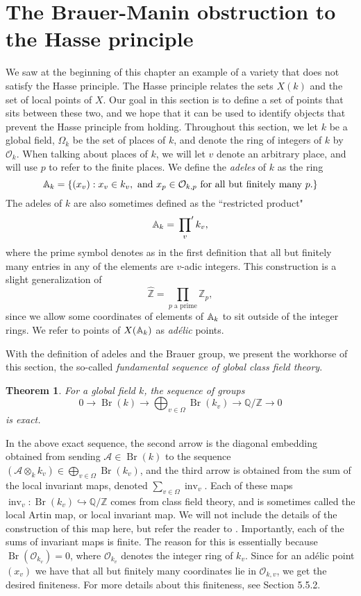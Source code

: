 \documentclass[12pt,twoside]{reedthesis}
\theoremstyle{plain}
\newtheorem{theorem}{Theorem}[chapter]
\theoremstyle{definition}
\theoremstyle{remark}
\newcommand{\ZZ}{\mathbb{Z}}
\newcommand{\Affine}{\mathbb{A}}
\newcommand{\QQ}{\mathbb{Q}}
\newcommand{\calA}{\mathcal{A}}
\newcommand{\calO}{\mathcal{O}}
\newcommand{\Br}{\operatorname{Br}}
\newcommand{\adele}{\reflectbox{$\Affine$}}
\newcommand{\inv}{\operatorname{inv}}
\begin{document}
\section{The Brauer-Manin obstruction to the Hasse principle}
We saw at the beginning of this chapter an example of a variety that does not satisfy the Hasse principle. The Hasse principle relates the sets $X(k)$ and the set of local points of $X$. Our goal in this section is to define a set of points that sits between these two, and we hope that it can be used to identify objects that prevent the Hasse principle from holding.
Throughout this section, we let $k$ be a global field, $\Omega_k$ be the set of places of $k$, and denote the ring of integers of $k$ by $\calO_k$. When talking about places of $k$, we will let $v$ denote an arbitrary place, and will use $p$ to refer to the finite places. We define the \emph{adeles} of $k$ as the ring
\[
\adele_k=\{(x_v):x_v\in k_v,\text{ and } x_p\in\calO_{k,p}\text{ for all but finitely many $p$.}\}
\]
The adeles of $k$ are also sometimes defined as the ``restricted product"
\[
\adele_k=\sideset{}{^\prime}\prod_v k_v,
\]
where the prime symbol denotes as in the first definition that all but finitely many entries in any of the elements are $v$-adic integers. This construction is a slight generalization of 
\[
\hat{\ZZ}=\prod_{p\text{ a prime}}\ZZ_p,
\] 
since we allow some coordinates of elements of $\adele_k$ to sit outside of the integer rings. We refer to points of $X(\adele_k)$ as \emph{ad\'elic} points.

With the definition of adeles and the Brauer group, we present the workhorse of this section, the so-called \emph{fundamental sequence of global class field theory}.
\begin{theorem} For a global field $k$, the sequence of groups
\[
0\longrightarrow \Br(k)\longrightarrow \bigoplus_{v\in\Omega}\Br(k_v)\longrightarrow \QQ/\ZZ\longrightarrow0
\]
is exact.\label{sequence}
\end{theorem}
\noindent In the above exact sequence, the second arrow is the diagonal embedding obtained from sending $\calA\in\Br(k)$ to the sequence $(\calA\otimes_k k_v)\in\bigoplus_{v\in\Omega}\Br(k_v)$, and the third arrow is obtained from the sum of the local invariant maps, denoted $\sum_{v\in\Omega} \inv_v$.   Each of these maps $\inv_v:\Br(k_v)\hookrightarrow\QQ/\ZZ$ comes from class field theory, and is sometimes called the local Artin map, or local invariant map. We will not include the details of the construction of this map here, but refer the reader to \cite{milneCFT}. Importantly, each of the sums of invariant maps is finite. The reason for this is essentially because $\Br(\calO_{k_v})=0$, where $\calO_{k_v}$ denotes the integer ring of $k_v$. Since for an ad\'elic point $(x_v)$ we have that all but finitely many coordinates lie in $\calO_{k,v}$, we get the desired finiteness. For more details about this finiteness, see \cite{skoQpoints} Section 5.5.2.
\end{document}
